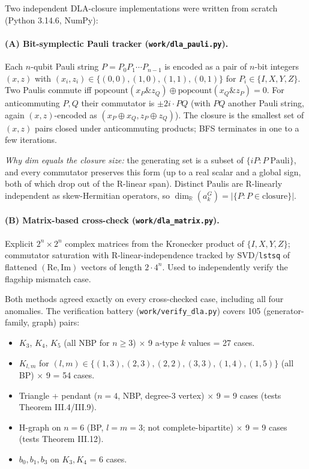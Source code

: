 \documentclass[11pt]{article}
\begin{document}
Two independent DLA-closure implementations were written from scratch (Python 3.14.6, NumPy):

\paragraph{(A) Bit-symplectic Pauli tracker (\texttt{work/dla\_pauli.py}).}
Each $n$-qubit Pauli string $P=P_0P_1\cdots P_{n-1}$ is encoded as a pair of $n$-bit integers $(x,z)$ with $(x_i,z_i)\in\{(0,0),(1,0),(1,1),(0,1)\}$ for $P_i\in\{I,X,Y,Z\}$. Two Paulis commute iff $\mathrm{popcount}(x_P\&z_Q)\oplus\mathrm{popcount}(x_Q\&z_P)=0$. For anticommuting $P,Q$ their commutator is $\pm 2i\cdot PQ$ (with $PQ$ another Pauli string, again $(x,z)$-encoded as $(x_P\oplus x_Q, z_P\oplus z_Q)$). The closure is the smallest set of $(x,z)$ pairs closed under anticommuting products; BFS terminates in one to a few iterations.

\emph{Why dim equals the closure size:} the generating set is a subset of $\{iP : P\;\text{Pauli}\}$, and every commutator preserves this form (up to a real scalar and a global sign, both of which drop out of the R-linear span). Distinct Paulis are R-linearly independent as skew-Hermitian operators, so $\dim_\mathbb{R}(a_k^G) = |\{P : P\in\text{closure}\}|$.

\paragraph{(B) Matrix-based cross-check (\texttt{work/dla\_matrix.py}).}
Explicit $2^n\times 2^n$ complex matrices from the Kronecker product of $\{I,X,Y,Z\}$; commutator saturation with R-linear-independence tracked by SVD/\texttt{lstsq} of flattened $(\mathrm{Re},\mathrm{Im})$ vectors of length $2\cdot 4^n$. Used to independently verify the flagship mismatch case.

Both methods agreed exactly on every cross-checked case, including all four anomalies. The verification battery (\texttt{work/verify\_dla.py}) covers 105 (generator-family, graph) pairs:

\begin{itemize}\itemsep0pt
  \item $K_3$, $K_4$, $K_5$ (all NBP for $n\ge 3$) $\times$ 9 a-type $k$ values = 27 cases.
  \item $K_{l,m}$ for $(l,m)\in\{(1,3),(2,3),(2,2),(3,3),(1,4),(1,5)\}$ (all BP) $\times$ 9 = 54 cases.
  \item Triangle + pendant ($n=4$, NBP, degree-3 vertex) $\times$ 9 = 9 cases (tests Theorem III.4/III.9).
  \item H-graph on $n=6$ (BP, $l=m=3$; not complete-bipartite) $\times$ 9 = 9 cases (tests Theorem III.12).
  \item $b_0, b_1, b_3$ on $K_3, K_4$ = 6 cases.
\end{itemize}
\end{document}
